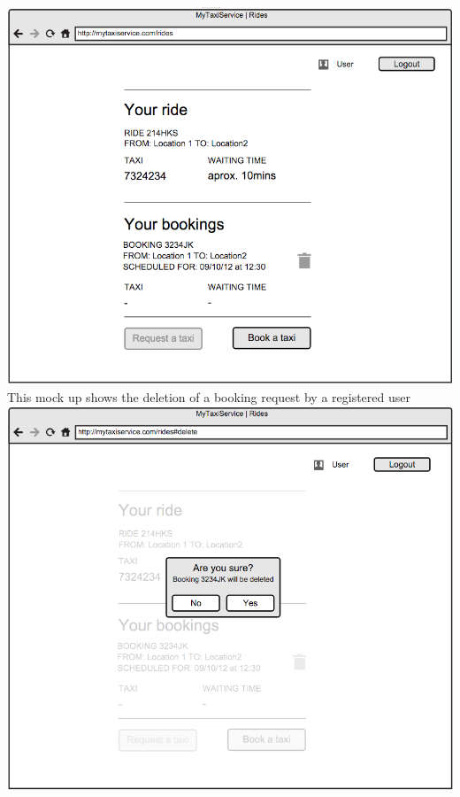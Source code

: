 \documentclass[11pt]{article} %
\begin{document}
        \includegraphics[scale=0.52]{viewReqBookPage.png}\newline
        \newpage
        \noindent
        This mock up shows the deletion of a booking request by a registered user\newline
        \newline
        \includegraphics[scale=0.52]{deleteBookInt.png}\newline
        \newline
        
\end{document}
